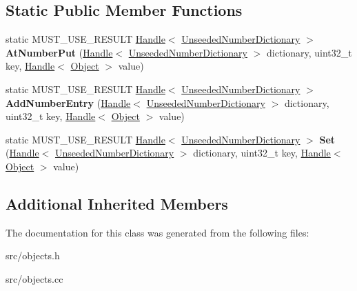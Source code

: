 \subsection*{Static Public Member Functions}
\begin{DoxyCompactItemize}
\item 
\hypertarget{classv8_1_1internal_1_1_unseeded_number_dictionary_acc70a12d0ce5e57e1b99048a1ecc7cbf}{}static M\+U\+S\+T\+\_\+\+U\+S\+E\+\_\+\+R\+E\+S\+U\+L\+T \hyperlink{classv8_1_1internal_1_1_handle}{Handle}$<$ \hyperlink{classv8_1_1internal_1_1_unseeded_number_dictionary}{Unseeded\+Number\+Dictionary} $>$ {\bfseries At\+Number\+Put} (\hyperlink{classv8_1_1internal_1_1_handle}{Handle}$<$ \hyperlink{classv8_1_1internal_1_1_unseeded_number_dictionary}{Unseeded\+Number\+Dictionary} $>$ dictionary, uint32\+\_\+t key, \hyperlink{classv8_1_1internal_1_1_handle}{Handle}$<$ \hyperlink{classv8_1_1internal_1_1_object}{Object} $>$ value)\label{classv8_1_1internal_1_1_unseeded_number_dictionary_acc70a12d0ce5e57e1b99048a1ecc7cbf}

\item 
\hypertarget{classv8_1_1internal_1_1_unseeded_number_dictionary_ae5727cfdee65439d364efdee1b3a241a}{}static M\+U\+S\+T\+\_\+\+U\+S\+E\+\_\+\+R\+E\+S\+U\+L\+T \hyperlink{classv8_1_1internal_1_1_handle}{Handle}$<$ \hyperlink{classv8_1_1internal_1_1_unseeded_number_dictionary}{Unseeded\+Number\+Dictionary} $>$ {\bfseries Add\+Number\+Entry} (\hyperlink{classv8_1_1internal_1_1_handle}{Handle}$<$ \hyperlink{classv8_1_1internal_1_1_unseeded_number_dictionary}{Unseeded\+Number\+Dictionary} $>$ dictionary, uint32\+\_\+t key, \hyperlink{classv8_1_1internal_1_1_handle}{Handle}$<$ \hyperlink{classv8_1_1internal_1_1_object}{Object} $>$ value)\label{classv8_1_1internal_1_1_unseeded_number_dictionary_ae5727cfdee65439d364efdee1b3a241a}

\item 
\hypertarget{classv8_1_1internal_1_1_unseeded_number_dictionary_ab7825649681ca2f45dd49c9e5687cc99}{}static M\+U\+S\+T\+\_\+\+U\+S\+E\+\_\+\+R\+E\+S\+U\+L\+T \hyperlink{classv8_1_1internal_1_1_handle}{Handle}$<$ \hyperlink{classv8_1_1internal_1_1_unseeded_number_dictionary}{Unseeded\+Number\+Dictionary} $>$ {\bfseries Set} (\hyperlink{classv8_1_1internal_1_1_handle}{Handle}$<$ \hyperlink{classv8_1_1internal_1_1_unseeded_number_dictionary}{Unseeded\+Number\+Dictionary} $>$ dictionary, uint32\+\_\+t key, \hyperlink{classv8_1_1internal_1_1_handle}{Handle}$<$ \hyperlink{classv8_1_1internal_1_1_object}{Object} $>$ value)\label{classv8_1_1internal_1_1_unseeded_number_dictionary_ab7825649681ca2f45dd49c9e5687cc99}

\end{DoxyCompactItemize}
\subsection*{Additional Inherited Members}


The documentation for this class was generated from the following files\+:\begin{DoxyCompactItemize}
\item 
src/objects.\+h\item 
src/objects.\+cc\end{DoxyCompactItemize}
